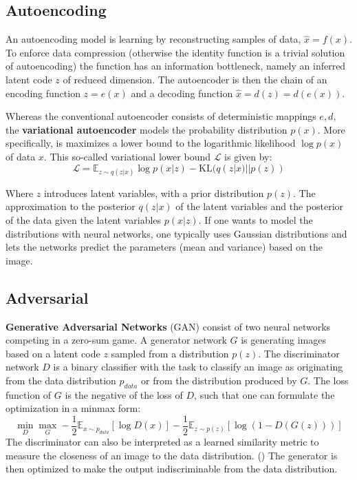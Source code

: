 	\subsection{Autoencoding}
		An autoencoding model is learning by reconstructing samples of data, $\hat x = f(x)$. To enforce data compression (otherwise the identity function is a trivial solution of autoencoding) the function has an information bottleneck, namely an inferred latent code $z$ of reduced dimension. The autoencoder is then the chain of an encoding function $z = e(x)$ and a decoding function $\hat x = d(z) = d(e(x))$.

		Whereas the conventional autoencoder consists of deterministic mappings $e, d$, the \textbf{variational autoencoder} models the probability distribution $p(x)$. More specifically, is maximizes a lower bound to the logarithmic likelihood $\log p(x)$ of data $x$. This so-called variational lower bound $\mathcal{L}$ is given by:
		\begin{equation}\label{eq:vae}
			\mathcal{L} = \mathds{E}_{z\sim q(z|x)}  \log p(x|z) - \textrm{KL}(q(z|x)||p(z))
		\end{equation}

		Where $z$ introduces latent variables, with a prior distribution $p(z)$. The approximation to the posterior $q(z|x)$ of the latent variables and the posterior of the data given the latent variables $p(x|z)$. If one wants to model the distributions with neural networks, one typically uses Gaussian distributions and lets the networks predict the parameters (mean and variance) based on the image.

	\subsection{Adversarial}
		\textbf{Generative Adversarial Networks} (GAN) consist of two neural networks competing in a zero-sum game. A generator network $G$ is generating images based on a latent code $z$ sampled from a distribution $p(z)$. The discriminator network $D$ is a binary classifier with the task to classify an image as originating from the data distribution $p_{data}$ or from the distribution produced by $G$. The loss function of $G$ is the negative of the loss of $D$, such that one can formulate the optimization in a minmax form:
		\begin{equation}
				\min_D \max_G - \frac{1}{2} \mathds{E}_{x\sim p_{data}}[\log D(x)] - \frac{1}{2}\mathds{E}_{z\sim p(z)}[\log (1-D(G(z)))]
		\end{equation}
		The discriminator can also be interpreted as a learned similarity metric to measure the closeness of an image to the data distribution. (\cite{Larsen2015AutoencodingMetric}) The generator is then optimized to make the output indiscriminable from the data distribution.

